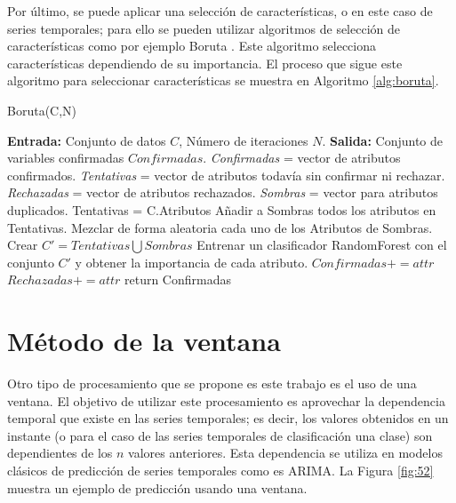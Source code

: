 Por último, se puede aplicar una selección de características, o en este caso de series temporales; para ello se pueden utilizar algoritmos de selección de características como por ejemplo Boruta \cite{kursa2010boruta}. Este algoritmo selecciona características dependiendo de su importancia. El proceso que sigue este algoritmo para seleccionar características se muestra en Algoritmo \ref{alg:boruta}.\newline

\begin{algorithm}[H]
	\caption{Boruta(C,N)}
	\label{alg:boruta}
	\begin{algorithmic}[0]
		\State \textbf{Entrada:} Conjunto de datos $C$, Número de iteraciones $N$.
		\State \textbf{Salida:} Conjunto de variables confirmadas $Confirmadas$.
		\State \textit{Confirmadas} = vector de atributos confirmados.
		\State \textit{Tentativas} = vector de atributos todavía sin confirmar ni rechazar.
		\State \textit{Rechazadas} = vector de atributos rechazados.
		\State \textit{Sombras} = vector para atributos duplicados.
		\State Tentativas = C.Atributos
			\State Añadir a Sombras todos los atributos en Tentativas.
			\State Mezclar de forma aleatoria cada uno de los Atributos de Sombras.
			\State Crear $C' = Tentativas \bigcup Sombras$
			\State Entrenar un clasificador RandomForest con el conjunto $C'$ y obtener la importancia de cada atributo.
					\State $Confirmadas += attr$
				\Else
					\State $Rechazadas += attr$
				\EndIf
			\EndFor
		\EndFor
		\State return Confirmadas
	\end{algorithmic}
\end{algorithm}

\section{Método de la ventana}
Otro tipo de procesamiento que se propone es este trabajo es el uso de una ventana. El objetivo de utilizar este procesamiento es aprovechar la dependencia temporal que existe en las series temporales; es decir, los valores obtenidos en un instante (o para el caso de las series temporales de clasificación una clase) son dependientes de los $n$ valores anteriores.\newline
\newpage
Esta dependencia se utiliza en modelos clásicos de predicción de series temporales como es ARIMA. La Figura \ref{fig:52} muestra un ejemplo de predicción usando una ventana.\newline

